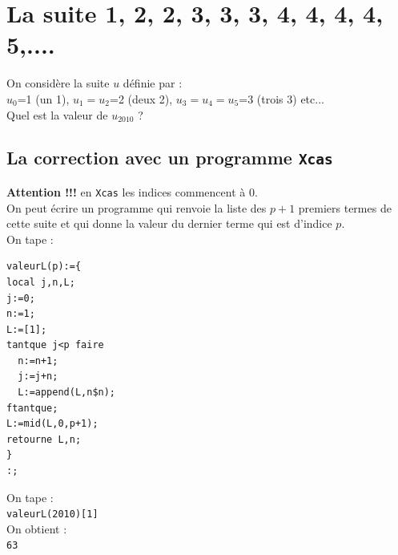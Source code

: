 \documentclass[a4paper,11pt]{book}
\begin{document}
\section{La suite 1, 2, 2, 3, 3, 3, 4, 4, 4, 4, 5,....}
On consid\`ere la suite $u$ d\'efinie par :\\
$u_0$=1 (un 1), $u_1=u_2$=2 (deux 2), $u_3=u_4=u_5$=3 (trois 3) etc...\\
Quel est la valeur de $u_{2010}$ ?
\subsection{La correction avec un programme {\tt Xcas}}
{\bf Attention !!!} en {\tt Xcas} les indices commencent \`a 0.\\
On peut \'ecrire un programme qui renvoie la liste des $p+1$ premiers termes de 
cette suite et qui donne la valeur du dernier terme qui est d'indice $p$.\\
On tape :
\begin{verbatim}
valeurL(p):={
local j,n,L;
j:=0;
n:=1;
L:=[1];
tantque j<p faire
  n:=n+1;
  j:=j+n;
  L:=append(L,n$n);
ftantque;
L:=mid(L,0,p+1);
retourne L,n;
}
:;
\end{verbatim} 
On tape :\\
{\tt valeurL(2010)[1]}\\
On obtient :\\
{\tt 63}
\end{document}

